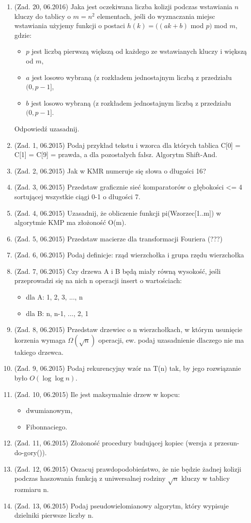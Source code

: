 \documentclass[10pt]{article}%
\begin{document}
\begin{enumerate}
\item (Zad. 20, 06.2016) Jaka jest oczekiwana liczba kolizji podczas wstawiania $n$ kluczy do tablicy o $ m = n^2 $ elementach, jeśli do wyznaczania miejsc wstawiania użyjemy funkcji o postaci $h(k) = ((ak + b)$ mod $p)$ mod $m$, gdzie:
\begin{itemize}
\item $p$ jest liczbą pierwszą większą od każdego ze wstawianych kluczy i większą od $m$,
\item $a$ jest losowo wybraną (z rozkładem jednostajnym liczbą z przedziału $(0, p-1]$,
\item $b$ jest losowo wybraną (z rozkładem jednostajnym liczbą z przedziału $(0, p-1]$.
\end{itemize} 
Odpowiedź uzasadnij.

\item (Zad. 1, 06.2015) Podaj przykład tekstu i wzorca dla których tablica C[0] = C[1] = C[9] = prawda, a dla pozostałych fałsz. Algorytm Shift-And.
\item (Zad. 2, 06.2015) Jak w KMR numeruje się słowa o długości 16?
\item (Zad. 3, 06.2015) Przedstaw graficznie sieć komparatorów o głębokości <= 4 sortującej wszystkie ciągi 0-1 o długości 7.
\item (Zad. 4, 06.2015) Uzasadnij, że obliczenie funkcji pi(Wzorzec[1..m]) w algorytmie KMP ma złożoność O(m).
\item (Zad. 5, 06.2015) Przedstaw macierze dla transformacji Fouriera (???) 
\item (Zad. 6, 06.2015) Podaj definicje: rząd wierzchołka i grupa rzędu wierzchołka
\item (Zad. 7, 06.2015) Czy drzewa A i B będą miały równą wysokość, jeśli przeprowadzi się na nich n operacji insert o wartościach:
\begin{itemize}
\item dla A: 1, 2, 3, ..., n 
\item dla B: n, n-1, ..., 2, 1 
\end{itemize}
\item (Zad. 8, 06.2015) Przedstaw drzewiec o n wierzchołkach, w którym usunięcie korzenia wymaga $\Omega(\sqrt{n})$ operacji, ew. podaj uzasadnienie dlaczego nie ma takiego drzewca.
\item (Zad. 9, 06.2015) Podaj rekurencyjny wzór na T(n) tak, by jego rozwiązanie było $O(\log \log n)$.
\item (Zad. 10, 06.2015) Ile jest maksymalnie drzew w kopcu:
\begin{itemize}
\item dwumianowym,
\item Fibonnaciego.
\end{itemize}
\item (Zad. 11, 06.2015) Złożoność procedury budującej kopiec (wersja z przesun-do-gory()). 
\item (Zad. 12, 06.2015) Oszacuj prawdopodobieństwo, że nie będzie żadnej kolizji podczas haszowania funkcją z uniwersalnej rodziny $\sqrt{n}$ kluczy w tablicy rozmiaru n. 
\item (Zad. 13, 06.2015) Podaj pseudowielomianowy algorytm, który wypisuje dzielniki pierwsze liczby n.


\end{enumerate}
\end{document}
